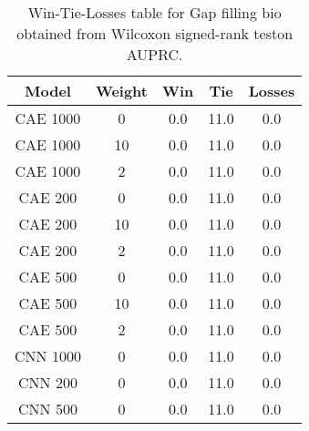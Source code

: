 \begin{table}[H]
\centering
\begin{tabular}{|c|c|c|c|c|}

\textbf{Model} & \textbf{Weight} &  \textbf{Win} &  \textbf{Tie} &  \textbf{Losses} \\
\hline

      CAE 1000 &               0 &           0.0 &          11.0 &              0.0 \\
\hline
      CAE 1000 &              10 &           0.0 &          11.0 &              0.0 \\
\hline
      CAE 1000 &               2 &           0.0 &          11.0 &              0.0 \\
\hline
       CAE 200 &               0 &           0.0 &          11.0 &              0.0 \\
\hline
       CAE 200 &              10 &           0.0 &          11.0 &              0.0 \\
\hline
       CAE 200 &               2 &           0.0 &          11.0 &              0.0 \\
\hline
       CAE 500 &               0 &           0.0 &          11.0 &              0.0 \\
\hline
       CAE 500 &              10 &           0.0 &          11.0 &              0.0 \\
\hline
       CAE 500 &               2 &           0.0 &          11.0 &              0.0 \\
\hline
      CNN 1000 &               0 &           0.0 &          11.0 &              0.0 \\
\hline
       CNN 200 &               0 &           0.0 &          11.0 &              0.0 \\
\hline
       CNN 500 &               0 &           0.0 &          11.0 &              0.0 \\
\hline

\end{tabular}
\caption{Win-Tie-Losses table for Gap filling bio obtained from Wilcoxon signed-rank teston AUPRC.}
\label{tab:gap_filling_bio_weighted_comparison_all}
\end{table}